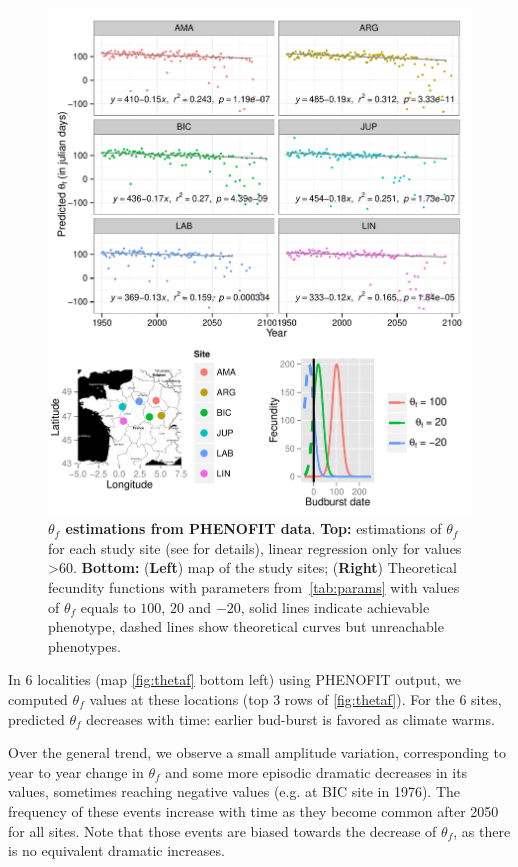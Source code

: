\begin{figure}[ht!]
	\centering
	\includegraphics[scale=1]{Figures/optsmaps.pdf}
	\caption{\textbf{$\theta_{f}$ estimations from PHENOFIT data}. \textbf{Top:} estimations of $\theta_f$ for each study site (see  for details), linear regression only for values >60. \textbf{Bottom:} (\textbf{Left}) map of the study sites; (\textbf{Right}) Theoretical fecundity functions with parameters from~\autoref{tab:params} with values of $\theta_f$ equals to $100$, $20$ and $-20$, solid lines indicate achievable phenotype, dashed lines show theoretical curves but unreachable phenotypes.}
	\label{fig:thetaf}
\end{figure}

In 6 localities (map \autoref{fig:thetaf} bottom left) using \textsc{PHENOFIT} output, we computed $\theta_f$ values at these locations (top 3 rows of \autoref{fig:thetaf}). For the 6 sites, predicted $\theta_f$ decreases with time: earlier bud-burst is favored as climate warms.

Over the general trend, we observe a small amplitude variation, corresponding to year to year change in $\theta_f$ and some more episodic dramatic decreases in its values, sometimes reaching negative values (e.g. at BIC site in 1976). The frequency of these events increase with time as they become common after 2050 for all sites. Note that those events are biased towards the decrease of $\theta_f$, as there is no equivalent dramatic increases.

